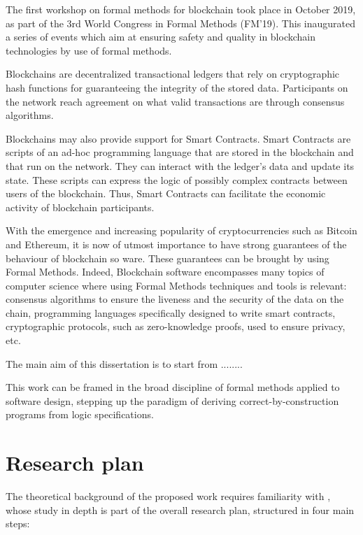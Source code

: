 \documentclass[a4paper, 11pt]{article} %
\begin{document}
The first workshop on formal methods for blockchain took place in October 2019, as part of the 3rd World Congress in Formal Methods (FM'19). This inaugurated a series of events which aim at ensuring safety and quality in blockchain technologies by use of formal methods.

Blockchains are decentralized transactional ledgers that rely on cryptographic hash functions for guaranteeing the integrity of the stored data. Participants on the network reach agreement on what valid transactions are through consensus algorithms.

Blockchains may also provide support for Smart Contracts. Smart Contracts are scripts of an ad-hoc programming language that are stored in the blockchain and that run on the network. They can interact with the ledger’s data and update its state. These scripts can express the logic of possibly complex contracts between users of the blockchain. Thus, Smart Contracts can facilitate the economic activity of blockchain participants.

With the emergence and increasing popularity of cryptocurrencies such as Bitcoin and Ethereum, it is now of utmost importance to have strong guarantees of the behaviour of blockchain so ware. These guarantees can be brought by using Formal Methods. Indeed, Blockchain software encompasses many topics of computer science where using Formal Methods techniques and tools is relevant: consensus algorithms to ensure the liveness and the security of the data on the chain, programming languages specifically designed to write smart contracts, cryptographic protocols, such as zero-knowledge proofs, used to ensure privacy, etc.

The main aim of this dissertation is to start from ........



This work can be framed in the broad discipline of formal methods applied to
software design, stepping up the paradigm of deriving correct-by-construction
programs from logic specifications.


\section*{Research plan}

The theoretical background of the proposed work requires familiarity with
\cite{BM97,Ba04a,Ol20}, whose study in depth is part of
the overall research plan, structured in four main steps:
\end{document}
